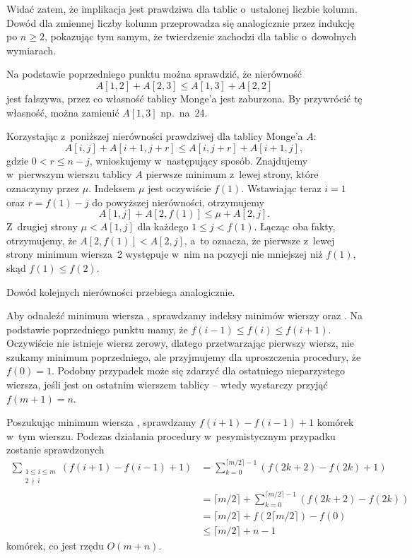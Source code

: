 Widać zatem, że implikacja jest prawdziwa dla tablic o~ustalonej liczbie kolumn. Dowód dla zmiennej liczby kolumn przeprowadza się analogicznie przez indukcję po $n\ge2$, pokazując tym samym, że twierdzenie zachodzi dla tablic o~dowolnych wymiarach.

\subproblem %
Na podstawie poprzedniego punktu można sprawdzić, że nierówność
\[
	A[1,2]+A[2,3] \le A[1,3]+A[2,2]
\]
jest fałszywa, przez co własność tablicy Monge'a jest zaburzona. By przywrócić tę własność, można zamienić $A[1,3]$ np.\ na~24.

\subproblem %
Korzystając z~poniższej nierówności prawdziwej dla tablicy Monge'a $A$:
\[
	A[i,j]+A[i+1,j+r] \le A[i,j+r]+A[i+1,j],
\]
gdzie $0<r\le n-j$, wnioskujemy w~następujący sposób. Znajdujemy w~pierwszym wierszu tablicy $A$ pierwsze minimum z~lewej strony, które oznaczymy przez $\mu$. Indeksem $\mu$ jest oczywiście $f(1)$. Wstawiając teraz $i=1$ oraz $r=f(1)-j$ do powyższej nierówności, otrzymujemy
\[
	A[1,j]+A[2,f(1)] \le \mu+A[2,j].
\]
Z~drugiej strony $\mu<A[1,j]$ dla każdego $1\le j<f(1)$. Łącząc oba fakty, otrzymujemy, że $A[2,f(1)]<A[2,j]$, a~to oznacza, że pierwsze z~lewej strony minimum wiersza~2 występuje w~nim na pozycji nie mniejszej niż $f(1)$, skąd $f(1)\le f(2)$.

Dowód kolejnych nierówności przebiega analogicznie.

\subproblem %
Aby odnaleźć minimum wiersza , sprawdzamy indeksy minimów wierszy  oraz . Na podstawie poprzedniego punktu mamy, że $f(i-1)\le f(i)\le f(i+1)$. Oczywiście nie istnieje wiersz zerowy, dlatego przetwarzając pierwszy wiersz, nie szukamy minimum poprzedniego, ale przyjmujemy dla uproszczenia procedury, że $f(0)=1$. Podobny przypadek może się zdarzyć dla ostatniego nieparzystego wiersza, jeśli jest on ostatnim wierszem tablicy -- wtedy wystarczy przyjąć $f(m+1)=n$.

Poszukując minimum wiersza , sprawdzamy $f(i+1)-f(i-1)+1$ komórek w~tym wierszu. Podczas działania procedury w~pesymistycznym przypadku zostanie sprawdzonych
\begin{align*}
	\sum_{\substack{1\le i\le m\\2\,\nmid\,i}}(f(i+1)-f(i-1)+1) &= \sum_{k=0}^{\lceil m/2\rceil-1}(f(2k+2)-f(2k)+1) \\[-4mm]
	&= \lceil m/2\rceil+\sum_{k=0}^{\lceil m/2\rceil-1}(f(2k+2)-f(2k)) \\[1mm]
	&= \lceil m/2\rceil+f(2\lceil m/2\rceil)-f(0) \\[2mm]
	&\le \lceil m/2\rceil+n-1
\end{align*}
komórek, co jest rzędu $O(m+n)$.


